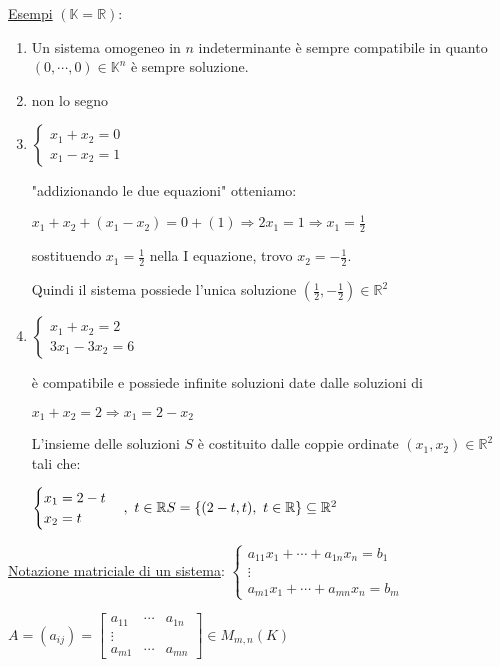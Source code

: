 \documentclass{article}
\newcommand{\ul}[1]{\underline{#1}}
\newcommand{\K}{\mathbb{K}}
\newcommand{\R}{\mathbb{R}}
\begin{document}
\ul{Esempi} $(\K=\R)$:
\begin{enumerate}
	\item Un sistema omogeneo in $n$ indeterminante è sempre compatibile in quanto $(0,\cdots,0)\in\K^n$ è sempre soluzione.
	\item non lo segno
	\item $\begin{cases}x_1+x_2=0\\x_1-x_2=1\end{cases}$

	  "addizionando le due equazioni" otteniamo:

	  $x_1+x_2+(x_1-x_2)=0+(1)\Rightarrow2x_1=1\Rightarrow x_1=\frac{1}{2}$

	  sostituendo $x_1=\frac{1}{2}$ nella I equazione, trovo $x_2=-\frac{1}{2}$.

	  Quindi il sistema possiede l'unica soluzione $(\frac{1}{2},-\frac{1}{2})\in\R^2$
	\item $\begin{cases}x_1+x_2=2\\3x_1-3x_2=6\end{cases}$

	  è compatibile e possiede infinite soluzioni date dalle soluzioni di

	  $x_1+x_2=2\Rightarrow x_1=2-x_2$

	  L'insieme delle soluzioni $S$ è costituito dalle coppie ordinate $(x_1,x_2)\in\R^2$ tali che:

	  $\begin{cases}x_1=2-t\\x_2=t\end{cases},\ t\in\R\\S=\{(2-t,t),\ t\in\R\}\subseteq\R^2$
\end{enumerate}


\ul{Notazione matriciale di un sistema}:
$\begin{cases}
	a_{11}x_1+\cdots+a_{1n}x_n=b_1 \\
	\vdots                         \\
	a_{m1}x_1+\cdots+a_{mn}x_n=b_m
\end{cases}$

$A=(a_{ij})=\begin{bmatrix}
	a_{11} & \cdots & a_{1n} \\
	\vdots                   \\
	a_{m1} & \cdots & a_{mn}
\end{bmatrix}\in M_{m,n}(K)$
\end{document}
